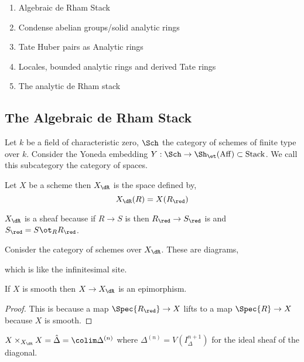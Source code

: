 \documentclass[12pt]{article}
\begin{document}
\begin{enumerate}
\item Algebraic de Rham Stack
\item Condense abelian groups/solid analytic rings
\item Tate Huber pairs as Analytic rings
\item Locales, bounded analytic rings and derived Tate rings
\item The analytic de Rham stack
\end{enumerate}

\subsection{The Algebraic de Rham Stack}

\newcommand{\Aff}{\mathrm{Aff}}
\newcommand{\Stack}{\mathrm{Stack}}

Let $k$ be a field of characteristic zero, $\Sch$ the category of schemes of finite type over $k$. Consider the Yoneda embedding $Y : \Sch \to \Sh_{\et}(\Aff) \subset \Stack$. We call this subcategory the category of spaces.
\begin{defn}
Let $X$ be a scheme then $X_{\dR}$ is the space defined by,
\[ X_{\dR}(R) = X(R_{\red}) \]
\end{defn}

\begin{rmk}
$X_{\dR}$ is a sheaf because if $R \to S$ is \etale then $R_{\red} \to S_{\red}$ is \etale and $S_{\red} = S \ot_R R_{\red}$. 
\end{rmk}

Conisder the category of schemes over $X_{\dR}$. These are diagrams,
\begin{center}
\end{center}
which is like the infinitesimal site. 

\begin{prop}
If $X$ is smooth then $X \to X_{\dR}$ is an epimorphism. 
\end{prop}

\begin{proof}
This is because a map $\Spec{R_{\red}} \to X$ lifts to a map $\Spec{R} \to X$ because $X$ is smooth. 
\end{proof}

\begin{prop}
$X \times_{X_{\dR}} X = \hat{\Delta} = \colim \Delta^{(n)}$ where $\Delta^{(n)} = V(I_{\Delta}^{n+1})$ for the ideal sheaf of the diagonal.
\end{prop}
\end{document}
